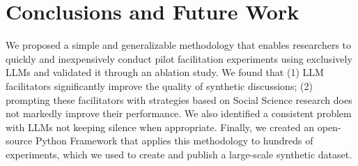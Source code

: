 %
\section{Conclusions and Future Work}

We proposed a simple and generalizable methodology that enables researchers to quickly and inexpensively conduct pilot facilitation experiments using exclusively \acp{LLM} and validated it through an ablation study. We found that (1) \ac{LLM} facilitators significantly improve the quality of synthetic discussions; (2) prompting these facilitators with strategies based on Social Science research does not markedly improve their performance. We also identified a consistent problem with \acp{LLM} not keeping silence when appropriate. Finally, we created an open-source Python Framework that applies this methodology to hundreds of experiments, which we used to create and publish a large-scale synthetic dataset.